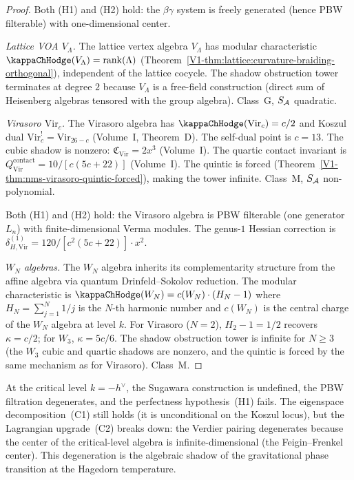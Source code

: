 \begin{proof}
Both (H1) and (H2) hold: the $\beta\gamma$ system is
freely generated (hence PBW filterable) with
one-dimensional center.

\emph{Lattice VOA $V_\Lambda$.}
The lattice vertex algebra $V_\Lambda$ has modular
characteristic $\kappaChHodge(V_\Lambda) = \rank(\Lambda)$
(Theorem~\ref{V1-thm:lattice:curvature-braiding-orthogonal}),
independent of the lattice cocycle.
The shadow obstruction tower terminates at degree $2$ because
$V_\Lambda$ is a free-field construction (direct sum
of Heisenberg algebras tensored with the group algebra).
Class~G, $S_{\mathcal{A}}$ quadratic.

\emph{Virasoro $\mathrm{Vir}_c$.}
The Virasoro algebra has $\kappaChHodge(\mathrm{Vir}_c) = c/2$
and Koszul dual $\mathrm{Vir}_c^! = \mathrm{Vir}_{26-c}$
(Volume~I, Theorem~D).
The self-dual point is $c = 13$.
The cubic shadow is nonzero: $\mathfrak{C}_{\mathrm{Vir}} =
2x^3$ (Volume~I).
The quartic contact invariant is
$Q_{\mathrm{Vir}}^{\mathrm{contact}} = 10/[c(5c+22)]$
(Volume~I).
The quintic is forced
(Theorem~\ref{V1-thm:nms-virasoro-quintic-forced}), making the
tower infinite. Class~M, $S_{\mathcal{A}}$ non-polynomial.

Both (H1) and (H2) hold: the Virasoro algebra is
PBW filterable (one generator $L_n$) with finite-dimensional
Verma modules. The genus-$1$ Hessian correction is
$\delta_{H,\mathrm{Vir}}^{(1)}
= 120 / [c^2(5c+22)] \cdot x^2$.

\emph{$W_N$ algebras.}
The $W_N$ algebra inherits its complementarity structure
from the affine algebra via quantum Drinfeld--Sokolov
reduction. The modular characteristic is
$\kappaChHodge(W_N) = c(W_N) \cdot (H_N - 1)$ where $H_N = \sum_{j=1}^{N} 1/j$
is the $N$-th harmonic number and $c(W_N)$ is the central
charge of the $W_N$ algebra at level $k$.
For Virasoro ($N=2$), $H_2 - 1 = 1/2$ recovers $\kappa = c/2$;
for $W_3$, $\kappa = 5c/6$.
The shadow obstruction tower is infinite for $N \ge 3$ (the $W_3$ cubic
and quartic shadows are nonzero, and the quintic is forced
by the same mechanism as for Virasoro). Class~M.
\end{proof}

\begin{remark}
At the critical level $k = -h^{\vee}$, the Sugawara
construction is undefined, the PBW filtration degenerates,
and the perfectness hypothesis~(H1) fails. The eigenspace
decomposition~(C1) still holds (it is unconditional on the
Koszul locus), but the Lagrangian upgrade~(C2) breaks down:
the Verdier pairing degenerates because the center of the
critical-level algebra is infinite-dimensional (the
Feigin--Frenkel center). This degeneration is the algebraic
shadow of the gravitational phase transition at the
Hagedorn temperature.
\end{remark}

